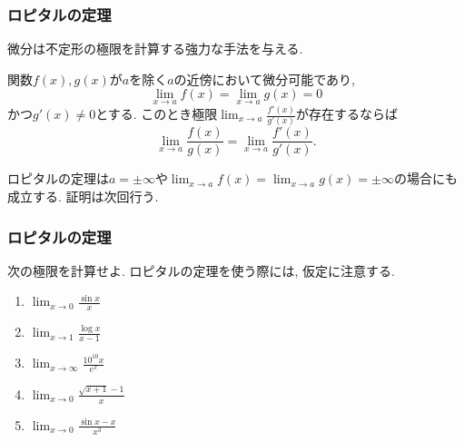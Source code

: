 \begin{frame}
\frametitle{ロピタルの定理}

微分は不定形の極限を計算する強力な手法を与える. 

\begin{Thm}[ロピタルの定理]
関数$f(x),g(x)$が$a$を除く$a$の近傍において微分可能であり, 
$$
\lim_{x\to a}f(x) = \lim_{x\to a}g(x)=0
$$
かつ$g'(x) \ne0$とする. このとき極限$\displaystyle \lim_{x\to a}\frac{f'(x)}{g'(x)}$が存在するならば
$$
\lim_{x\to a}\frac{f(x)}{g(x)} = \lim_{x\to a}\frac{f'(x)}{g'(x)}. 
$$
\end{Thm}

ロピタルの定理は$a=\pm \infty$や$\displaystyle \lim_{x\to a}f(x) = \lim_{x\to a}g(x)=\pm \infty$の場合にも成立する. 
証明は次回行う. 

\end{frame}




\begin{frame}
\frametitle{ロピタルの定理}


\begin{Prob}
次の極限を計算せよ. ロピタルの定理を使う際には, 仮定に注意する.  \vspace{2mm}
\begin{enumerate}
\item $\displaystyle \lim_{x\to 0} \frac{\sin x}{x}$ \vspace{2mm}
\item  $\displaystyle \lim_{x\to 1} \frac{\log x}{x-1}$ \vspace{2mm}
\item $\displaystyle \lim_{x\to \infty} \frac{10^{10}x}{e^x}$ \vspace{2mm}
\item $\displaystyle \lim_{x\to 0} \frac{\sqrt{x+1}-1}{x}$ \vspace{2mm}
\item $\displaystyle \lim_{x\to 0} \frac{\sin x-x}{x^3}$ 
\end{enumerate}
\end{Prob}

\end{frame}



